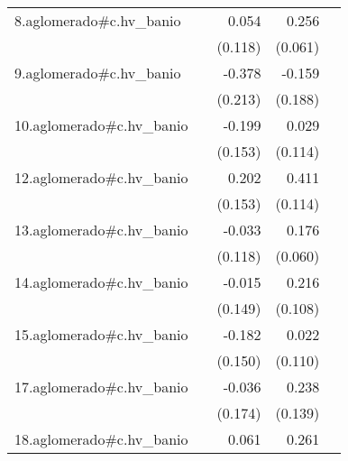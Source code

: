{\begin{longtable}{l*{4}{D{.}{.}{-1}}}
\addlinespace
8.aglomerado#c.hv\_banio&                     &       0.054         &       0.256\sym{***}&                     \\
            &                     &     (0.118)         &     (0.061)         &                     \\
\addlinespace
9.aglomerado#c.hv\_banio&                     &      -0.378         &      -0.159         &                     \\
            &                     &     (0.213)         &     (0.188)         &                     \\
\addlinespace
10.aglomerado#c.hv\_banio&                     &      -0.199         &       0.029         &                     \\
            &                     &     (0.153)         &     (0.114)         &                     \\
\addlinespace
12.aglomerado#c.hv\_banio&                     &       0.202         &       0.411\sym{***}&                     \\
            &                     &     (0.153)         &     (0.114)         &                     \\
\addlinespace
13.aglomerado#c.hv\_banio&                     &      -0.033         &       0.176\sym{**} &                     \\
            &                     &     (0.118)         &     (0.060)         &                     \\
\addlinespace
14.aglomerado#c.hv\_banio&                     &      -0.015         &       0.216\sym{*}  &                     \\
            &                     &     (0.149)         &     (0.108)         &                     \\
\addlinespace
15.aglomerado#c.hv\_banio&                     &      -0.182         &       0.022         &                     \\
            &                     &     (0.150)         &     (0.110)         &                     \\
\addlinespace
17.aglomerado#c.hv\_banio&                     &      -0.036         &       0.238         &                     \\
            &                     &     (0.174)         &     (0.139)         &                     \\
\addlinespace
18.aglomerado#c.hv\_banio&                     &       0.061         &       0.261\sym{***}&                     \\

\end{longtable}}
